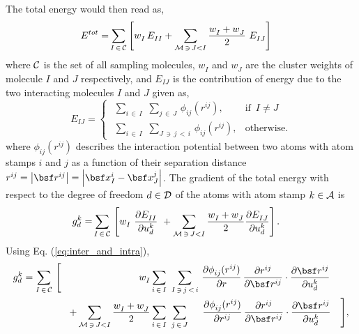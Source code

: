 \documentclass[a4paper,10pt]{article}
\newcommand{\refeq}[1]{Eq. (\ref{eq:#1})}
\newcommand{\norm}[1]{\left\lvert #1 \right\rvert}
\def\mcl  #1{               {\cal #1}}
\begin{document}
The total energy would then read as,
\begin{align}
 E^{tot} = &\sum_{I \, \in \, \mcl C}
            \left[
		  w^{}_I \,
		  E^{}_{II} 
		  +
		  \sum_{\mcl M \, \ni \, J < I}
		  \frac{w^{}_I + w^{}_J}{2} \,\,
                  E^{}_{IJ} 
            \right]
\end{align}
where $\mcl C$ is the set of all sampling molecules, $w^{}_I$ and $w^{}_J$ are 
the cluster weights of molecule $I$ and $J$ respectively, and $E^{}_{IJ}$ is 
the contribution of energy due to the two interacting molecules $I$ and $J$ 
given as,
\begin{equation}
 E^{}_{IJ} =  \begin{cases}                   \,\,
               \sum\limits_{i \, \in \, I}    \,\,
               \sum\limits_{j \, \in \, J}    \,
		\phi^{}_{ij}(r^{ij}),
		& \text{if } \,  I \neq J \\[1em] \,\,

               \sum\limits_{i \, \in \, I}    \,\,
               \sum\limits_{J \, \ni \, j \, < \, i} \,
               \phi^{}_{ij}(r^{ij}), 
               & \text{otherwise}.
              \end{cases}
\label{eq:inter_and_intra}
\end{equation}
where $\phi^{}_{ij}(r^{ij})$ describes the interaction potential between two 
atoms with atom stamps $i$ and $j$ as a function of their separation distance 
$r^{ij} = \norm{\bsf r^{ij}} = \norm{ \bsf x^{i}_{I} - \bsf x^{j}_{J} }$. 
The gradient of the total energy with respect to the degree of freedom $d \in 
\mcl D$ of the atoms with atom stamp $k \in \mcl A$ is
\begin{align}
 g^k_d = &\sum_{I \, \in \, \mcl C}  \,
	  \left[
	        w^{}_I \,\,
		\frac{\partial E^{}_{II}}{\partial u^k_d}
		\,\,
		+
		\sum_{\mcl M \, \ni \, J < I}
		\frac{w^{}_I + w^{}_J}{2}
		\frac{\partial E^{}_{IJ}}{\partial u^k_d}
	   \right].
\end{align}
Using \refeq{inter_and_intra},
\begin{align}
 g^k_d = \sum_{I \, \in \, \mcl C}  \,
          \Bigg[
            \,\,\,\,\,\,\,\,\,\,\,\,
            \,\,\,\,\,\,\,\,\,\,\,\,
            \,\,\,\,\,\,\,\,\,\,\,\,
            \,\,\,\,\,\,\,\,\,\,\,\,
            w^{}_I
            &
	    \sum_{i \, \in \, I}                          \,\,
	    \sum_{I \, \ni \, j \, < \, i}                \,
               \frac{\partial \phi^{}_{ij}(r^{ij})}{\partial r} \, 
               \frac{\partial r^{ij}}{\partial \bsf r^{ij}} \cdot
               \frac{\partial \bsf r^{ij}}{\partial u^k_d}     \\
	    +
	    \sum_{\mcl M \, \ni \, J < I}
	    \frac{w^{}_I + w^{}_J}{2}
	    &
            \sum_{i \, \in \, I}           \,\,
	    \sum_{j \, \in \, J}           \,\,\,\,\,\,\,\,
                 \frac{\partial \phi^{}_{ij}(r^{ij})}{\partial r^{ij}} \, 
                 \frac{\partial r^{ij}}{\partial \bsf r^{ij}} \cdot
                 \frac{\partial \bsf r^{ij}}{\partial u^k_d}
	    \,\,\,\,\,\,
           \Bigg],
\end{align}
\end{document}

